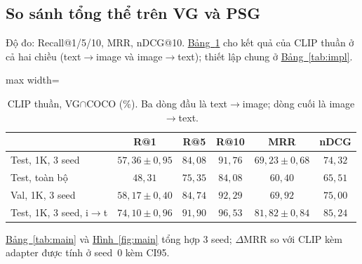 \documentclass[conference]{IEEEtran}
\begin{document}
\subsection{So sánh tổng thể trên VG và PSG}\label{sec:r-main}
Độ đo: Recall@1/5/10, MRR, nDCG@10. \hyperref[tab:clip]{Bảng~\ref*{tab:clip}} cho kết quả của CLIP thuần ở cả hai chiều (text$\to$image và image$\to$text); thiết lập chung ở \hyperref[tab:impl]{Bảng~\ref*{tab:impl}}.

\begin{table}[t]
\caption{CLIP thuần, VG$\cap$COCO (\%). Ba dòng đầu là text$\to$image; dòng cuối là image$\to$text.}\label{tab:clip}
\centering\footnotesize
\setlength{\tabcolsep}{3pt}
\begin{adjustbox}{max width=\columnwidth}
\begin{tabular}{lccccc}
\toprule
 & R@1 & R@5 & R@10 & MRR & nDCG\\\midrule
Test, 1K, 3 seed & $57{,}36\!\pm\!0{,}95$ & $84{,}08$ & $91{,}76$ & $69{,}23\!\pm\!0{,}68$ & $74{,}32$\\
Test, toàn bộ & $48{,}31$ & $75{,}35$ & $84{,}08$ & $60{,}40$ & $65{,}51$\\
Val, 1K, 3 seed & $58{,}17\!\pm\!0{,}40$ & $84{,}74$ & $92{,}29$ & $69{,}92$ & $75{,}00$\\\midrule
Test, 1K, 3 seed, i$\to$t & $74{,}10\!\pm\!0{,}96$ & $91{,}90$ & $96{,}53$ & $81{,}82\!\pm\!0{,}84$ & $85{,}24$\\\bottomrule
\end{tabular}
\end{adjustbox}
\end{table}

\hyperref[tab:main]{Bảng~\ref*{tab:main}} và \hyperref[fig:main]{Hình~\ref*{fig:main}} tổng hợp 3 seed; $\Delta$MRR so với CLIP kèm adapter được tính ở seed~0 kèm CI95.
\end{document}
